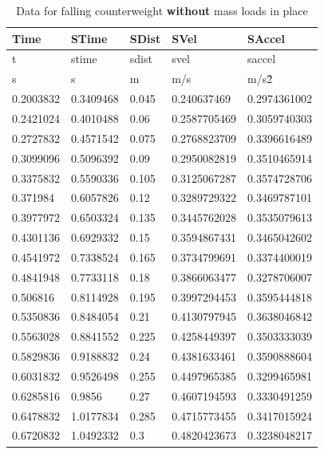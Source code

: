 \documentclass[coverpage]{article}
\begin{document}
	\begin{table}[!ht]
		\caption{Data for falling counterweight \textbf{without} mass loads in place}
		\label{table:without-masses-table}
		\vspace{.1in}
		
		\centering
		\begin{tabular}{|l|l|l|l|l|}
			Time & STime & SDist & SVel & SAccel \\ \hline
			t & stime & sdist & svel & saccel \\ \hline
			s & s & m & m/s & m/s\^2 \\ \hline
			0.2003832 & 0.3409468 & 0.045 & 0.240637469 & 0.2974361002 \\ \hline
			0.2421024 & 0.4010488 & 0.06 & 0.2587705469 & 0.3059740303 \\ \hline
			0.2727832 & 0.4571542 & 0.075 & 0.2768823709 & 0.3396616489 \\ \hline
			0.3099096 & 0.5096392 & 0.09 & 0.2950082819 & 0.3510465914 \\ \hline
			0.3375832 & 0.5590336 & 0.105 & 0.3125067287 & 0.3574728706 \\ \hline
			0.371984 & 0.6057826 & 0.12 & 0.3289729322 & 0.3469787101 \\ \hline
			0.3977972 & 0.6503324 & 0.135 & 0.3445762028 & 0.3535079613 \\ \hline
			0.4301136 & 0.6929332 & 0.15 & 0.3594867431 & 0.3465042602 \\ \hline
			0.4541972 & 0.7338524 & 0.165 & 0.3734799691 & 0.3374400019 \\ \hline
			0.4841948 & 0.7733118 & 0.18 & 0.3866063477 & 0.3278706007 \\ \hline
			0.506816 & 0.8114928 & 0.195 & 0.3997294453 & 0.3595444818 \\ \hline
			0.5350836 & 0.8484054 & 0.21 & 0.4130797945 & 0.3638046842 \\ \hline
			0.5563028 & 0.8841552 & 0.225 & 0.4258449397 & 0.3503333039 \\ \hline
			0.5829836 & 0.9188832 & 0.24 & 0.4381633461 & 0.3590888604 \\ \hline
			0.6031832 & 0.9526498 & 0.255 & 0.4497965385 & 0.3299465981 \\ \hline
			0.6285816 & 0.9856 & 0.27 & 0.4607194593 & 0.3330491259 \\ \hline
			0.6478832 & 1.0177834 & 0.285 & 0.4715773455 & 0.3417015924 \\ \hline
			0.6720832 & 1.0492332 & 0.3 & 0.4820423673 & 0.3238048217 \\ \hline

\end{tabular}
\end{table}
\end{document}
